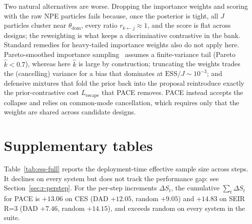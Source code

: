 Two natural alternatives are worse. Dropping the importance weights and scoring with the
raw NPE particles fails because, once the posterior is tight, all $J$ particles cluster
near $\theta_{\mathrm{dom}}$, every ratio $r_{k\leftarrow j}\approx1$, and the score is
flat across designs; the reweighting is what keeps a discriminative contrastive in the
bank. Standard remedies for heavy-tailed importance weights also do not apply here.
Pareto-smoothed importance sampling~\citep{vehtari2024pareto} assumes a finite-variance
tail (Pareto $\hat k<0.7$), whereas here $\hat k$ is large by construction; truncating
the weights trades the (cancelling) variance for a bias that dominates at
$\mathrm{ESS}/J\sim10^{-3}$; and defensive mixtures that fold the prior back into the
proposal reintroduce exactly the prior-contrastive cost $L_{\mathrm{escape}}$ that PACE
removes. PACE instead accepts the collapse and relies on common-mode cancellation, which
requires only that the weights are shared across candidate designs.

\chapter{Supplementary tables}
\label{app:supp}

Table~\ref{tab:ess-full} reports the deployment-time effective sample size across
steps. It declines on every system but does not track the performance gap: see
Section~\ref{sec:r-perstep}. For the per-step increments $\Delta S_t$, the
cumulative $\sum_t\Delta S_t$ for PACE is $+13.06$ on CES (DAD $+12.05$, random
$+9.05$) and $+14.83$ on SEIR R=3 (DAD $+7.46$, random $+14.15$), and exceeds random
on every system in the suite.

